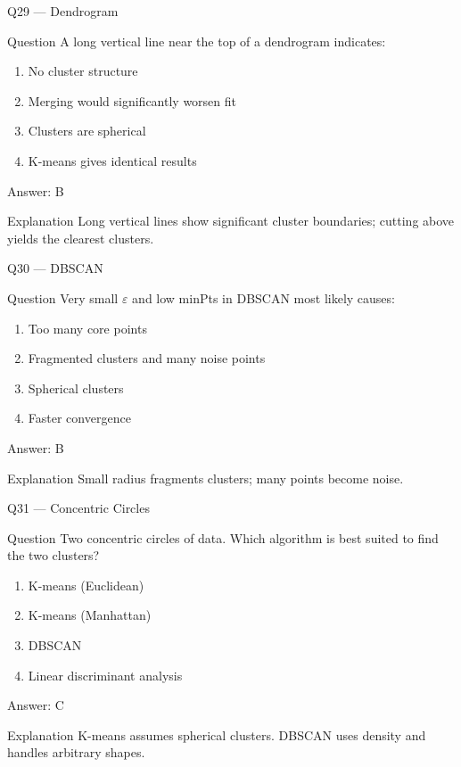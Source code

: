 \documentclass[aspectratio=169,8pt]{beamer}
\begin{document}
	\begin{frame}{Q29 --- Dendrogram}
		\begin{block}{Question}
			A long vertical line near the top of a dendrogram indicates:
		\end{block}
		\begin{enumerate}
			\item No cluster structure
			\item Merging would significantly worsen fit
			\item Clusters are spherical
			\item K-means gives identical results
		\end{enumerate}
		\begin{exampleblock}{Answer: B}\end{exampleblock}
		\begin{block}{Explanation}
			Long vertical lines show significant cluster boundaries; cutting above yields the clearest clusters.
		\end{block}
	\end{frame}
	
	\begin{frame}{Q30 --- DBSCAN}
		\begin{block}{Question}
			Very small $\varepsilon$ and low minPts in DBSCAN most likely causes:
		\end{block}
		\begin{enumerate}
			\item Too many core points
			\item Fragmented clusters and many noise points
			\item Spherical clusters
			\item Faster convergence
		\end{enumerate}
		\begin{exampleblock}{Answer: B}\end{exampleblock}
		\begin{block}{Explanation}
			Small radius fragments clusters; many points become noise.
		\end{block}
	\end{frame}
	
	\begin{frame}{Q31 --- Concentric Circles}
		\begin{block}{Question}
			Two concentric circles of data. Which algorithm is best suited to find the two clusters?
		\end{block}
		\begin{enumerate}
			\item K-means (Euclidean)
			\item K-means (Manhattan)
			\item DBSCAN
			\item Linear discriminant analysis
		\end{enumerate}
		\begin{exampleblock}{Answer: C}\end{exampleblock}
		\begin{block}{Explanation}
			K-means assumes spherical clusters. DBSCAN uses density and handles arbitrary shapes.
		\end{block}
	\end{frame}
	
\end{document}
